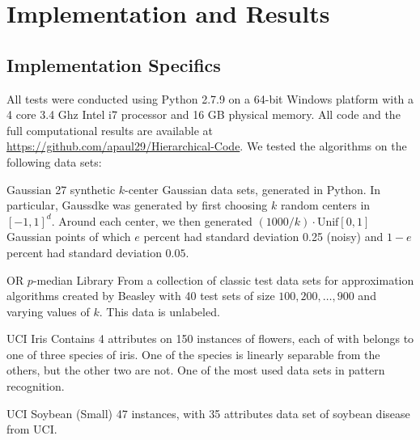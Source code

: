 \documentclass[conference, 10pt, final]{IEEEtran}
\begin{document}
\section{Implementation and Results}

\subsection{Implementation Specifics}

All tests were conducted using Python 2.7.9 on a 64-bit Windows platform with a 4 core 3.4 Ghz Intel i7 processor and 16 GB physical memory. All code and the full computational results are available at \url{https://github.com/apaul29/Hierarchical-Code}.
We tested the algorithms on the following data sets:
\begin{LaTeXdescription}
\item[Gaussian] 27 synthetic $k$-center Gaussian data sets, generated in Python. In particular, Gauss\textunderscore d\textunderscore k\textunderscore e was generated by first choosing $k$ random centers in $[-1,1]^d$. Around each center, we then generated $(1000/k) \cdot \mathrm{Unif}[0,1]$ Gaussian points of which $e$ percent had standard deviation 0.25 (noisy) and $1-e$ percent had standard deviation $0.05$. 
\item[OR $p$-median Library] \cite{Beasley} From a collection of classic test data sets for approximation algorithms created by Beasley with 40 test sets of size $100, 200, \ldots, 900$ and varying values of $k$. This data is unlabeled.
\item[UCI Iris] \cite{Iris} Contains 4 attributes on 150 instances of flowers, each of with belongs to one of three species of iris.  One of the species is linearly separable from the others, but the other two are not.  One of the most used data sets in pattern recognition.
\item[UCI Soybean (Small)] \cite{Soybean} 47 instances, with 35 attributes data set of soybean disease from UCI.
\end{LaTeXdescription} 
\end{document}
